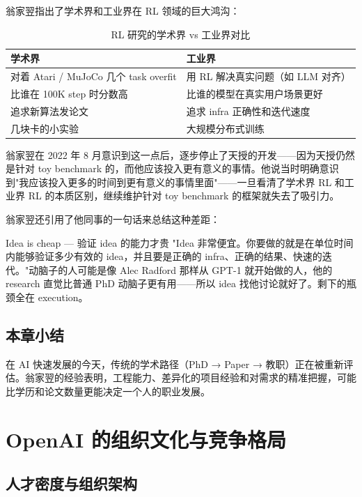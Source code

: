 \documentclass[a4paper]{article}
\begin{document}
翁家翌指出了学术界和工业界在 RL 领域的巨大鸿沟：

\begin{table}[H]
\centering
\begin{tabular}{ll}
\toprule
\textbf{学术界} & \textbf{工业界} \\
\midrule
对着 Atari / MuJoCo 几个 task overfit & 用 RL 解决真实问题（如 LLM 对齐） \\
比谁在 100K step 时分数高 & 比谁的模型在真实用户场景更好 \\
追求新算法发论文 & 追求 infra 正确性和迭代速度 \\
几块卡的小实验 & 大规模分布式训练 \\
\bottomrule
\end{tabular}
\caption{RL 研究的学术界 vs 工业界对比}
\end{table}

翁家翌在 2022 年 8 月意识到这一点后，逐步停止了天授的开发——因为天授仍然是针对 toy benchmark 的，而他应该投入更有意义的事情。他说当时明确意识到"我应该投入更多的时间到更有意义的事情里面"——一旦看清了学术界 RL 和工业界 RL 的本质区别，继续维护针对 toy benchmark 的框架就失去了吸引力。

翁家翌还引用了他同事的一句话来总结这种差距：

\begin{importantbox}{Idea is cheap --- 验证 idea 的能力才贵}
"Idea 非常便宜。你要做的就是在单位时间内能够验证多少有效的 idea，并且要是正确的 infra、正确的结果、快速的迭代。"动脑子的人可能是像 Alec Radford 那样从 GPT-1 就开始做的人，他的 research 直觉比普通 PhD 动脑子更有用——所以 idea 找他讨论就好了。剩下的瓶颈全在 execution。
\end{importantbox}

\subsection{本章小结}

在 AI 快速发展的今天，传统的学术路径（PhD → Paper → 教职）正在被重新评估。翁家翌的经验表明，工程能力、差异化的项目经验和对需求的精准把握，可能比学历和论文数量更能决定一个人的职业发展。


\section{OpenAI 的组织文化与竞争格局}

\subsection{人才密度与组织架构}
\end{document}
